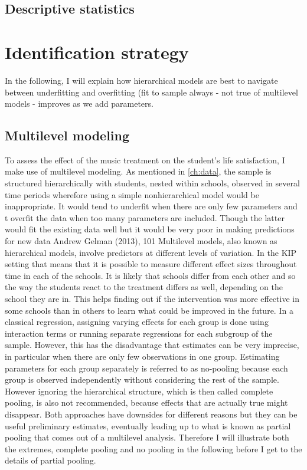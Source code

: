 \documentclass[a4, 12pt]{article}
\begin{document}
\hypertarget{descriptive-statistics}{%
\subsection{Descriptive statistics}\label{descriptive-statistics}}

\label{sec:descriptives}

\hypertarget{identification-strategy}{%
\section{Identification strategy}\label{identification-strategy}}

\label{sec:identification}
In the following, I will explain how hierarchical models are best to navigate between underfitting and overfitting (fit to sample always - not true of multilevel models - improves as we add parameters.

\hypertarget{multilevel-modeling}{%
\subsection{Multilevel modeling}\label{multilevel-modeling}}

To assess the effect of the music treatment on the student's life satisfaction, I make use of multilevel modeling. As mentioned in \ref{ch:data}, the sample is structured hierarchically with students, nested within schools, observed in several time periods wherefore using a simple nonhierarchical model would be inappropriate. It would tend to underfit when there are only few parameters and t overfit the data when too many parameters are included. Though the latter would fit the existing data well but it would be very poor in making predictions for new data Andrew Gelman (2013), 101 Multilevel models, also known as hierarchical models, involve predictors at different levels of variation. In the KIP setting that means that it is possible to measure different effect sizes throughout time in each of the schools. It is likely that schools differ from each other and so the way the students react to the treatment differs as well, depending on the school they are in. This helps finding out if the intervention was more effective in some schools than in others to learn what could be improved in the future. In a classical regression, assigning varying effects for each group is done using interaction terms or running separate regressions for each subgroup of the sample. However, this has the disadvantage that estimates can be very imprecise, in particular when there are only few observations in one group. Estimating parameters for each group separately is referred to as no-pooling because each group is observed independently without considering the rest of the sample. However ignoring the hierarchical structure, which is then called complete pooling, is also not recommended, because effects that are actually true might disappear. Both approaches have downsides for different reasons but they can be useful preliminary estimates, eventually leading up to what is known as partial pooling that comes out of a multilevel analysis. Therefore I will illustrate both the extremes, complete pooling and no pooling in the following before I get to the details of partial pooling.
\end{document}
